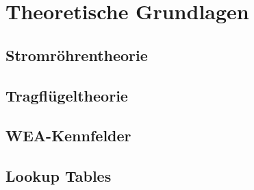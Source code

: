 \section{Theoretische Grundlagen} \label{theo_grundl}

\subsection{Stromröhrentheorie}

\subsection{Tragflügeltheorie}

\subsection{WEA-Kennfelder}

\subsection{Lookup Tables}
